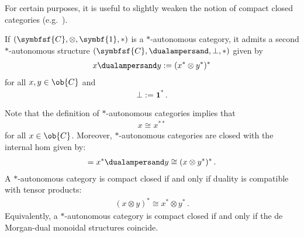     For certain purposes, it is useful to slightly weaken the notion of compact closed categories (e.g.~\citet{kissinger_categorical_2019,barr_-autonomous_1991}).
    \begin{property}\label{hda:de_morgan_duality}
        If $(\symbfsf{C},\otimes,\symbf{1},\ast)$ is a $\ast$-autonomous category, it admits a second $\ast$-autonomous structure $(\symbfsf{C},\dualampersand,\bot,\ast)$ given by
        \begin{gather}
            x\dualampersand y := (x^*\otimes y^*)^*
        \end{gather}
        for all $x,y\in\ob{C}$ and
        \begin{gather}
            \bot := \symbf{1}^*\,.
        \end{gather}
    \end{property}

    \begin{property}[Involution]
        Note that the definition of $\ast$-autonomous categories implies that
        \begin{gather}
            x\cong x^{**}
        \end{gather}
        for all $x\in\ob{C}$. Moreover, $\ast$-autonomous categories are closed with the internal hom given by:
        \begin{gather}
            [x,y] = x^*\dualampersand y \cong (x\otimes y^*)^*\,.
        \end{gather}
        A $\ast$-autonomous category is compact closed if and only if duality is compatible with tensor products:
        \begin{gather}
            (x\otimes y)^*\cong x^*\otimes y^*\,.
        \end{gather}
        Equivalently, a $\ast$-autonomous category is compact closed if and only if the de Morgan-dual monoidal structures coincide.
    \end{property}


